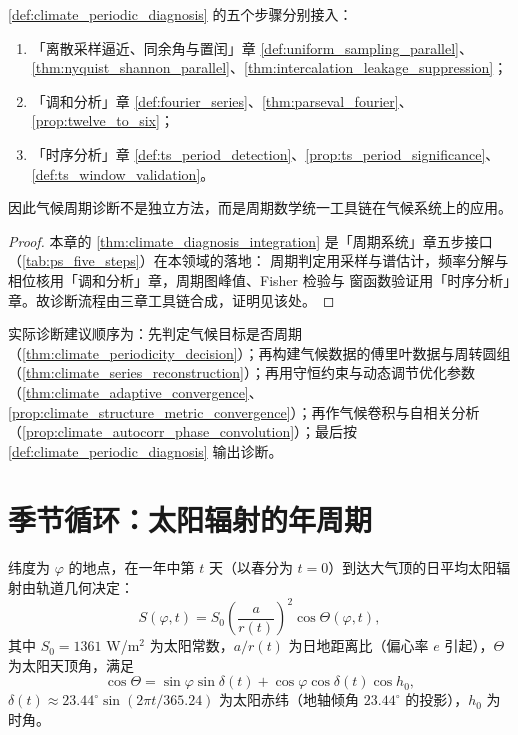 \begin{theorem}[气候周期诊断流程与三章接口]\label{thm:climate_diagnosis_integration}
\cref{def:climate_periodic_diagnosis} 的五个步骤分别接入：
\begin{enumerate}[label=(\roman*)]
    \item 「离散采样逼近、同余角与置闰」章 \cref{def:uniform_sampling_parallel}、\cref{thm:nyquist_shannon_parallel}、\cref{thm:intercalation_leakage_suppression}；
    \item 「调和分析」章 \cref{def:fourier_series}、\cref{thm:parseval_fourier}、\cref{prop:twelve_to_six}；
    \item 「时序分析」章 \cref{def:ts_period_detection}、\cref{prop:ts_period_significance}、\cref{def:ts_window_validation}。
\end{enumerate}
因此气候周期诊断不是独立方法，而是周期数学统一工具链在气候系统上的应用。
\end{theorem}

\begin{proof}
本章的 \cref{thm:climate_diagnosis_integration} 是「周期系统」章五步接口（\cref{tab:ps_five_steps}）在本领域的落地：
周期判定用采样与谱估计，频率分解与相位核用「调和分析」章，周期图峰值、Fisher 检验与
窗函数验证用「时序分析」章。故诊断流程由三章工具链合成，证明见该处。
\end{proof}

\begin{remark}[整合后的操作顺序]\label{rem:climate_integration_order}
实际诊断建议顺序为：先判定气候目标是否周期（\cref{thm:climate_periodicity_decision}）；再构建气候数据的傅里叶数据与周转圆组（\cref{thm:climate_series_reconstruction}）；再用守恒约束与动态调节优化参数（\cref{thm:climate_adaptive_convergence}、\cref{prop:climate_structure_metric_convergence}）；再作气候卷积与自相关分析（\cref{prop:climate_autocorr_phase_convolution}）；最后按 \cref{def:climate_periodic_diagnosis} 输出诊断。
\end{remark}

\section{季节循环：太阳辐射的年周期}

\begin{definition}[到达大气顶的太阳辐射]\label{def:solar_insolation}
纬度为 $\varphi$ 的地点，在一年中第 $t$ 天（以春分为 $t=0$）到达大气顶的日平均太阳辐射由轨道几何决定：
\[
S(\varphi, t) = S_0\left(\frac{a}{r(t)}\right)^2 \cos\Theta(\varphi, t),
\]
其中 $S_0 = 1361$ W/m$^2$ 为太阳常数，$a/r(t)$ 为日地距离比（偏心率 $e$ 引起），$\Theta$ 为太阳天顶角，满足
\[
\cos\Theta = \sin\varphi \sin\delta(t) + \cos\varphi \cos\delta(t) \cos h_0,
\]
$\delta(t) \approx 23.44^\circ \sin(2\pi t/365.24)$ 为太阳赤纬（地轴倾角 $23.44^\circ$ 的投影），$h_0$ 为时角。
\end{definition}

